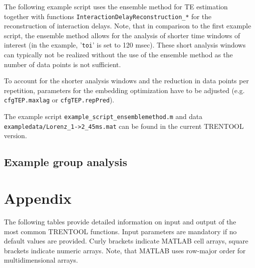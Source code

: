 \documentclass[a4paper,10pt]{article}
\begin{document}
The following example script uses the ensemble method for TE estimation together with functions \texttt{InteractionDelayReconstruction\_*} for the reconstruction of interaction delays. Note, that in comparison to the first example script, the ensemble method allows for the analysis of shorter time windows of interest (in the example, '\verb&toi&' is set to 120 msec). These short analysis windows can typically not be realized without the use of the ensemble method as the number of data points is not sufficient.

To account for the shorter analysis windows and the reduction in data points per repetition, parameters for the embedding optimization have to be adjusted (e.g. \verb&cfgTEP.maxlag& or \verb&cfgTEP.repPred&).

The example script \texttt{example\_script\_ensemblemethod.m} and data \texttt{exampledata/Lorenz\_1->2\_45ms.mat} can be found in the current TRENTOOL version.




\subsection{Example group analysis}




\newpage
\section{Appendix} \label{sec:appendix}

The following tables provide detailed information on input and output of the most common TRENTOOL functions. Input parameters are mandatory if no default values are provided. Curly brackets indicate MATLAB cell arrays, square brackets indicate numeric arrays. Note, that MATLAB uses row-major order for multidimensional arrays.


\onehalfspacing


\end{document}
